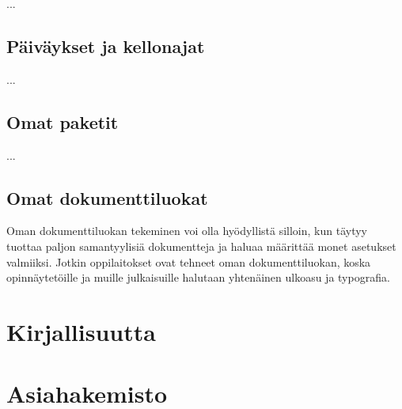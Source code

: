 \documentclass{book}
\begin{document}

...

\section{Päiväykset ja kellonajat}

...

\section{Omat paketit}

...

\section{Omat dokumenttiluokat}
\label{luku:omat_dokumenttiluokat}

Oman dokumenttiluokan tekeminen voi olla hyödyllistä silloin, kun täytyy
tuottaa paljon samantyylisiä dokumentteja ja haluaa määrittää monet
asetukset valmiiksi. Jotkin oppilaitokset ovat tehneet oman
dokumenttiluokan, koska opinnäytetöille ja muille julkaisuille halutaan
yhtenäinen ulkoasu ja typografia.

\backmatter

\chapter{Kirjallisuutta}
\label{luku:kirjallisuutta}

\printbibliography[heading=none]

\chapter{Asiahakemisto}

\printindex[paketit]\pagebreak
\printindex[komennot]
\printindex[ymparistot]
\printindex[mitat]
\end{document}
